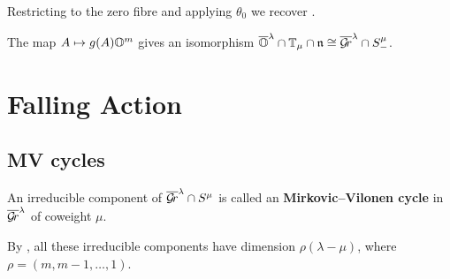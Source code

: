 \documentclass{article} %
\begin{document}
Restricting to the zero fibre and applying $\theta_0$ we recover \cite[Corollary~5.2.2]{dthesis}. 
% 
% 
\begin{corollary}
    \label{cor:mvy}
The map $ A \mapsto g(A)\mathbb O^m$ gives an isomorphism    $\overline{\mathbb O}^\lambda \cap \mathbb T_\mu\cap\mathfrak n \cong\overline{\mathcal{G}\!r}^\lambda\cap S^\mu_-$.
\end{corollary}


\section{Falling Action} %
\subsection{MV cycles}
% 
% 
% 
\begin{definition}
An irreducible component of $\overline{\mathcal{G}\!r}^\lambda \cap S^\mu$ is called an \textbf{Mirkovic--Vilonen cycle} in $\overline{\mathcal{G}\!r}^\lambda$ of coweight $\mu$.
\end{definition}
By \cite{mirkovic2007geometric}, all these irreducible components have dimension $ \rho(\lambda - \mu)$, where $ \rho = (m, m-1, \dots, 1)$.



% 
\end{document}
